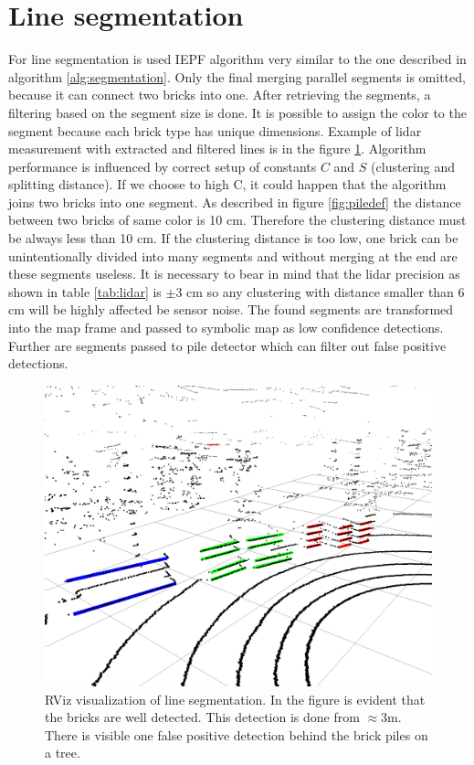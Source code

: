 \section{Line segmentation}
For line segmentation is used IEPF algorithm very similar to the one described in algorithm \ref{alg:segmentation}. Only the final merging parallel segments is omitted, because it can connect two bricks into one. After retrieving the segments, a filtering based on the segment size is done. It is possible to assign the color to the segment because each brick type has unique dimensions. Example of lidar measurement with extracted and filtered lines is in the figure \ref{fig:segments}. Algorithm performance is influenced by correct setup of constants $C$ and $S$ (clustering and splitting distance). If we choose to high C, it could happen that the algorithm joins two bricks into one segment. As described in figure \ref{fig:piledef} the distance between two bricks of same color is 10 cm. Therefore the clustering distance must be always less than 10 cm. If the clustering distance is too low, one brick can be unintentionally divided into many segments and without merging at the end are these segments useless. It is necessary to bear in mind that the lidar precision as shown in table \ref{tab:lidar} is $\pm3$ cm so any clustering with distance smaller than 6 cm will be highly affected be sensor noise. The found segments are transformed into the map frame and passed to symbolic map as low confidence detections. Further are segments passed to pile detector which can filter out false positive detections.

\hspace{8mm}

\begin{figure}[H]
\centering
\includegraphics[scale=0.43]{fig/segments}
\caption[Line segmentation visualization]{RViz visualization of line segmentation. In the figure is evident that the bricks are well detected. This detection is done from $\approx3$m. There is visible one false positive detection behind the brick piles on a tree.}
\label{fig:segments}
\end{figure}


